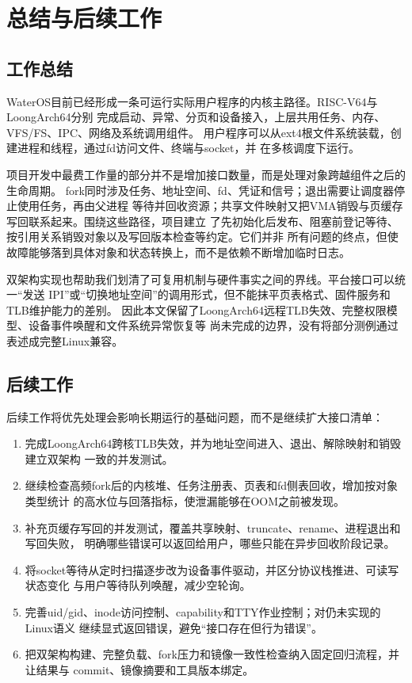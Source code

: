 \chapter{总结与后续工作}

\section{工作总结}

WaterOS目前已经形成一条可运行实际用户程序的内核主路径。RISC-V64与LoongArch64分别
完成启动、异常、分页和设备接入，上层共用任务、内存、VFS/FS、IPC、网络及系统调用组件。
用户程序可以从ext4根文件系统装载，创建进程和线程，通过fd访问文件、终端与socket，并
在多核调度下运行。

项目开发中最费工作量的部分并不是增加接口数量，而是处理对象跨越组件之后的生命周期。
fork同时涉及任务、地址空间、fd、凭证和信号；退出需要让调度器停止使用任务，再由父进程
等待并回收资源；共享文件映射又把VMA销毁与页缓存写回联系起来。围绕这些路径，项目建立
了先初始化后发布、阻塞前登记等待、按引用关系销毁对象以及写回版本检查等约定。它们并非
所有问题的终点，但使故障能够落到具体对象和状态转换上，而不是依赖不断增加临时日志。

双架构实现也帮助我们划清了可复用机制与硬件事实之间的界线。平台接口可以统一“发送
IPI”或“切换地址空间”的调用形式，但不能抹平页表格式、固件服务和TLB维护能力的差别。
因此本文保留了LoongArch64远程TLB失效、完整权限模型、设备事件唤醒和文件系统异常恢复等
尚未完成的边界，没有将部分测例通过表述成完整Linux兼容。

\section{后续工作}

后续工作将优先处理会影响长期运行的基础问题，而不是继续扩大接口清单：

\begin{enumerate}
  \item 完成LoongArch64跨核TLB失效，并为地址空间进入、退出、解除映射和销毁建立双架构
  一致的并发测试。
  \item 继续检查高频fork后的内核堆、任务注册表、页表和fd侧表回收，增加按对象类型统计
  的高水位与回落指标，使泄漏能够在OOM之前被发现。
  \item 补充页缓存写回的并发测试，覆盖共享映射、truncate、rename、进程退出和写回失败，
  明确哪些错误可以返回给用户，哪些只能在异步回收阶段记录。
  \item 将socket等待从定时扫描逐步改为设备事件驱动，并区分协议栈推进、可读写状态变化
  与用户等待队列唤醒，减少空轮询。
  \item 完善uid/gid、inode访问控制、capability和TTY作业控制；对仍未实现的Linux语义
  继续显式返回错误，避免“接口存在但行为错误”。
  \item 把双架构构建、完整负载、fork压力和镜像一致性检查纳入固定回归流程，并让结果与
  commit、镜像摘要和工具版本绑定。
\end{enumerate}

